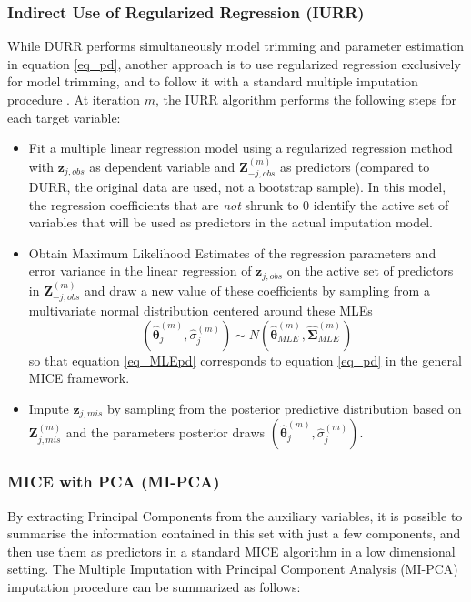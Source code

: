 \subsubsection{Indirect Use of Regularized Regression (IURR)}
	While DURR performs simultaneously model trimming and parameter estimation in equation \eqref{eq_pd}, 
	another approach is to use regularized regression exclusively for model trimming, and to follow it 
	with a standard multiple imputation procedure \citep{zhaoLong:2016, dengEtAl:2016}.
	At iteration $m$, the IURR algorithm performs the following steps for each target variable:
%
	\begin{itemize}
%
	\item Fit a multiple linear regression model using a regularized regression method with $\bm{z}_{j,obs}$ as 
		dependent variable and $\bm{Z}_{-j,obs}^{(m)}$ as predictors (compared to DURR, the original data are 
		used, not a bootstrap sample).
		In this model, the regression coefficients that are \emph{not} shrunk to 0 identify the active 
		set of variables that will be used as predictors in the actual imputation model.
	
	\item Obtain Maximum Likelihood Estimates of the regression parameters and error variance in the linear
		regression of $\bm{z}_{j,obs}$ on the active set of predictors in $\bm{Z}_{-j,obs}^{(m)}$ and
		draw a new value of these coefficients by sampling from a multivariate normal distribution
		centered around these MLEs
%
		\begin{equation}\label{eq_MLEpd}
		(\hat{\bm{\theta}}_{j}^{(m)}, \hat{\sigma}_{j}^{(m)}) \sim N(\hat{\bm{\theta}}_{MLE}^{(m)}, 
			\hat{\bm{\Sigma}}_{MLE}^{(m)})
		\end{equation}
%
		so that equation \eqref{eq_MLEpd} corresponds to equation \eqref{eq_pd} in the general MICE framework.

	\item Impute $\bm{z}_{j,mis}$ by sampling from the posterior predictive distribution based 
		on $\bm{Z}_{j,mis}^{(m)}$ and the parameters posterior draws $(\hat{\bm{\theta}}_{j}^{(m)}, 
		\hat{\sigma}_{j}^{(m)})$.
%
	\end{itemize}

\subsubsection{MICE with PCA (MI-PCA)}
	By extracting Principal Components from the auxiliary variables, it is possible to summarise the information 
	contained in this set with just a few components, and then use them as predictors in a standard MICE algorithm 
	in a low dimensional setting.
	The Multiple Imputation with Principal Component Analysis (MI-PCA) imputation procedure can be summarized as follows:

